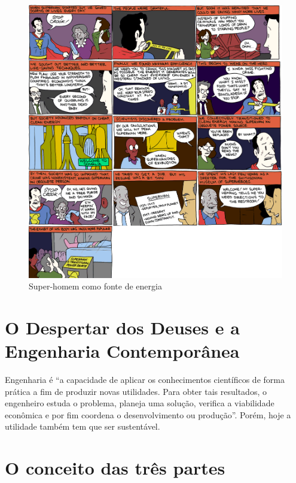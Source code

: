 \documentclass[14pt,portuguese]{extreport}
\begin{document}
      \begin{figure}[h]
	\centering
	\includegraphics[width=\textwidth]{comic_superman}
	\caption{Super-homem como fonte de energia}
      \end{figure}
        
  \chapter{O Despertar dos Deuses e a Engenharia Contemporânea}

      Engenharia é “a capacidade de aplicar os conhecimentos científicos
      de forma prática a fim de produzir novas utilidades. Para obter tais
      resultados, o engenheiro estuda o problema, planeja uma solução,
      verifica a viabilidade econômica e por fim coordena o desenvolvimento
      ou produção”. Porém, hoje a utilidade também tem que ser sustentável.

  \chapter{O conceito das três partes}
\end{document}
